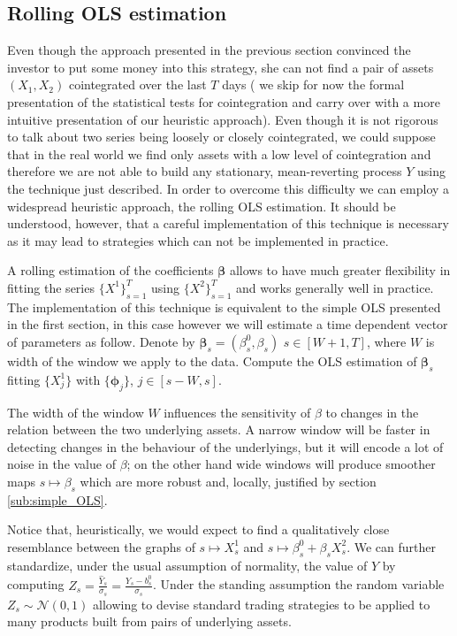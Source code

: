 \documentclass[a4paper,11pt]{article}
\theoremstyle{remark}
\theoremstyle{plain}
\begin{document}
\subsection{Rolling OLS estimation}
Even though the approach presented in the previous section convinced the investor to put some money into this strategy, she can not find a pair of assets $(X_1,X_2)$ cointegrated over the last $T$ days ( we skip for now the formal presentation of the statistical tests for cointegration and carry over with a more intuitive presentation of our heuristic approach). Even though it is not rigorous to talk about two series being loosely or closely cointegrated, we could suppose that in the real world we find only assets with a low level of cointegration and therefore we are not able to build any stationary, mean-reverting process $Y$ using the technique just described. In order to overcome this difficulty we can employ a widespread heuristic approach, the rolling OLS estimation. It should be understood, however, that a careful implementation of this technique is necessary as it may lead to strategies which can not be implemented in practice.

A rolling estimation of the coefficients $\boldsymbol{\beta}$ allows to have much greater flexibility in fitting the series $\{X^1\}_{s=1}^{T}$ using $\{X^2\}_{s=1}^{T}$ and works generally well in practice. The implementation of this technique is equivalent to the simple OLS presented in the first section, in this case however we will estimate a time dependent vector of parameters as follow. Denote by $\boldsymbol{\beta}_s=(\beta^0_s, \beta_s)$ $s\in[W+1,T]$, where $W$ is width of the window we apply to the data. Compute the OLS estimation of $\boldsymbol{\beta}_s$ fitting $\{X^1_j\}$ with $\{\boldsymbol{\phi}_j\}$, $j\in[s-W,s]$.

The width of the window $W$ influences the sensitivity of $\beta$ to changes in the relation between the two underlying assets. A narrow window will be faster in detecting changes in the behaviour of the underlyings, but it will encode a lot of noise in the value of $\beta$; on the other hand wide windows will produce smoother maps $s\mapsto\beta_s$ which are more robust and, locally, justified by section \ref{sub:simple_OLS}.

Notice that, heuristically, we would expect to find a qualitatively close resemblance between the graphs of $s\mapsto X^1_s$ and $s\mapsto \beta^0_s+\beta_s X^2_s$. We can further standardize, under the usual assumption of normality, the value of $Y$ by computing $Z_s=\frac{\hat{Y}_s}{\sigma_s}=\frac{Y_s-b^0_s}{\sigma_s}$. Under the standing assumption the random variable $Z_s\sim\mathcal{N}(0,1)$ allowing to devise standard trading strategies to be applied to many products built from pairs of underlying assets.
\end{document}
